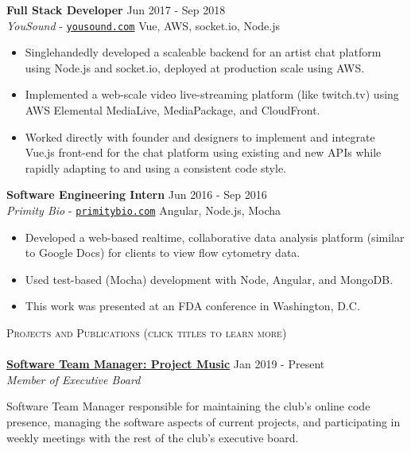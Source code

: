 \documentclass[11pt]{extarticle}
\newcommand{\lineunder} {
	\vspace*{-8pt} \\
	\hspace*{-18pt} \hrulefill \\
}
\newcommand{\header} [1] {
	{\hspace*{-18pt}\vspace*{6pt} \textsc{#1}}
	\vspace*{-6pt} \lineunder
}
\begin{document}
\noindent
\textbf{Full Stack Developer} \hfill Jun 2017 - Sep 2018\\
\textit{YouSound} - \href{https://yousound.com/}{\texttt{yousound.com}} \hfill Vue, AWS, socket.io, Node.js \\
\vspace{-6mm}
\begin{itemize} \itemsep 0.1pt
	\item Singlehandedly developed a scaleable backend for an artist chat platform using Node.js and socket.io, deployed at production scale using AWS.
	\item Implemented a web-scale video live-streaming platform (like twitch.tv) using AWS Elemental MediaLive, MediaPackage, and CloudFront.
    \item Worked directly with founder and designers to implement and integrate Vue.js front-end for the chat platform using existing and new APIs while rapidly adapting to and using a consistent code style.
\end{itemize}

\noindent
\textbf{Software Engineering Intern} \hfill Jun 2016 - Sep 2016\\
\textit{Primity Bio} - \href{https://primitybio.com}{\texttt{primitybio.com}} \hfill Angular, Node.js, Mocha \\
\vspace{-6mm}
\begin{itemize} \itemsep 0.1pt
	\item Developed a web-based realtime, collaborative data analysis platform (similar to Google Docs) for clients to view flow cytometry data.
	\item Used test-based (Mocha) development with Node, Angular, and MongoDB.
	\item This work was presented at an FDA conference in Washington, D.C.
\end{itemize}

\newpage
\noindent
\header{Projects and Publications (click titles to learn more)}
\noindent
\href{https://maizepages.umich.edu/organization/expermentalmusicalinstruments}{\textbf{Software Team Manager: Project Music}} \hfill Jan 2019 - Present\\
\textit{Member of Executive Board} \\
\vspace{-25pt}
\begin{paragraph}{}
	 Software Team Manager responsible for maintaining the club's online code presence, managing the software aspects of current projects, and participating in weekly meetings with the rest of the club's executive board.  \\
\end{paragraph}
\end{document}
